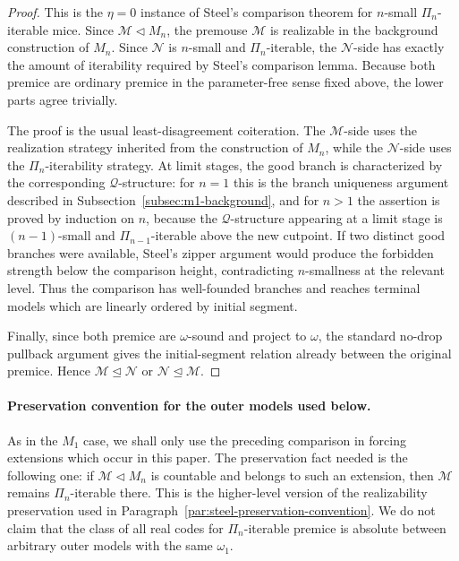 \documentclass[a4paper,11pt]{article}
\begin{document}
\begin{proof}
This is the $\eta=0$ instance of Steel's comparison theorem for $n$-small $\Pi_n$-iterable mice.  Since $\mathcal M\triangleleft M_n$, the premouse $\mathcal M$ is realizable in the background construction of $M_n$.  Since $\mathcal N$ is $n$-small and $\Pi_n$-iterable, the $\mathcal N$-side has exactly the amount of iterability required by Steel's comparison lemma.  Because both premice are ordinary premice in the parameter-free sense fixed above, the lower parts agree trivially.

The proof is the usual least-disagreement coiteration.  The $\mathcal M$-side uses the realization strategy inherited from the construction of $M_n$, while the $\mathcal N$-side uses the $\Pi_n$-iterability strategy.  At limit stages, the good branch is characterized by the corresponding $\mathcal Q$-structure: for $n=1$ this is the branch uniqueness argument described in Subsection~\ref{subsec:m1-background}, and for $n>1$ the assertion is proved by induction on $n$, because the $\mathcal Q$-structure appearing at a limit stage is $(n-1)$-small and $\Pi_{n-1}$-iterable above the new cutpoint.  If two distinct good branches were available, Steel's zipper argument would produce the forbidden strength below the comparison height, contradicting $n$-smallness at the relevant level.  Thus the comparison has well-founded branches and reaches terminal models which are linearly ordered by initial segment.

Finally, since both premice are $\omega$-sound and project to $\omega$, the standard no-drop pullback argument gives the initial-segment relation already between the original premice.  Hence $\mathcal M\trianglelefteq\mathcal N$ or $\mathcal N\trianglelefteq\mathcal M$.
\end{proof}

\paragraph{Preservation convention for the outer models used below.}\label{par:steel-mn-preservation-convention}
As in the $M_1$ case, we shall only use the preceding comparison in forcing extensions which occur in this paper.  The preservation fact needed is the following one: if $\mathcal M\triangleleft M_n$ is countable and belongs to such an extension, then $\mathcal M$ remains $\Pi_n$-iterable there.  This is the higher-level version of the realizability preservation used in Paragraph~\ref{par:steel-preservation-convention}.  We do not claim that the class of all real codes for $\Pi_n$-iterable premice is absolute between arbitrary outer models with the same $\omega_1$.
\end{document}
